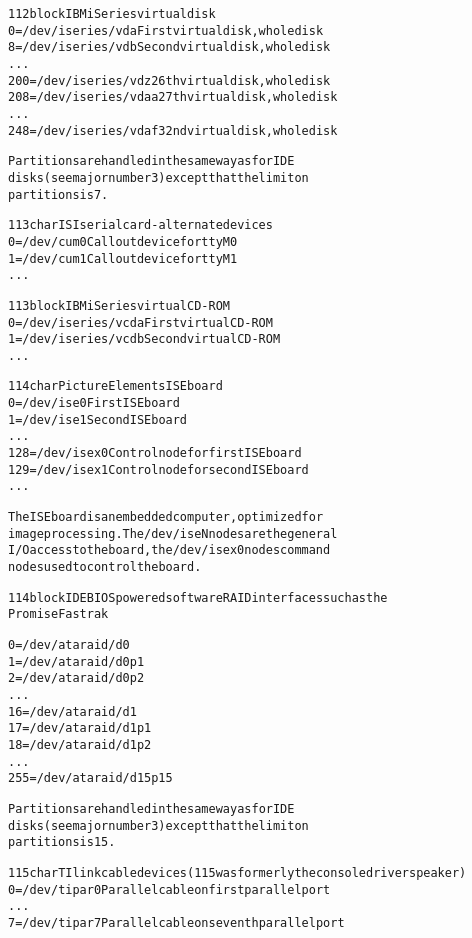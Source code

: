 \documentclass[a4paper,8pt,english]{sphinxmanual}
\begin{document}
\begin{alltt}
 112 block      IBM iSeries virtual disk
                  0 = /dev/iseries/vda  First virtual disk, whole disk
                  8 = /dev/iseries/vdb  Second virtual disk, whole disk
                    ...
                200 = /dev/iseries/vdz  26th virtual disk, whole disk
                208 = /dev/iseries/vdaa 27th virtual disk, whole disk
                    ...
                248 = /dev/iseries/vdaf 32nd virtual disk, whole disk

                Partitions are handled in the same way as for IDE
                disks (see major number 3) except that the limit on
                partitions is 7.

 113 char       ISI serial card - alternate devices
                  0 = /dev/cum0         Callout device for ttyM0
                  1 = /dev/cum1         Callout device for ttyM1
                    ...

 113 block      IBM iSeries virtual CD-ROM
                  0 = /dev/iseries/vcda First virtual CD-ROM
                  1 = /dev/iseries/vcdb Second virtual CD-ROM
                    ...

 114 char       Picture Elements ISE board
                  0 = /dev/ise0         First ISE board
                  1 = /dev/ise1         Second ISE board
                    ...
                128 = /dev/isex0        Control node for first ISE board
                129 = /dev/isex1        Control node for second ISE board
                    ...

                The ISE board is an embedded computer, optimized for
                image processing. The /dev/iseN nodes are the general
                I/O access to the board, the /dev/isex0 nodes command
                nodes used to control the board.

 114 block       IDE BIOS powered software RAID interfaces such as the
                Promise Fastrak

                   0 = /dev/ataraid/d0
                   1 = /dev/ataraid/d0p1
                   2 = /dev/ataraid/d0p2
                  ...
                  16 = /dev/ataraid/d1
                  17 = /dev/ataraid/d1p1
                  18 = /dev/ataraid/d1p2
                  ...
                 255 = /dev/ataraid/d15p15

                Partitions are handled in the same way as for IDE
                disks (see major number 3) except that the limit on
                partitions is 15.

 115 char       TI link cable devices (115 was formerly the console driver speaker)
                  0 = /dev/tipar0    Parallel cable on first parallel port
                  ...
                  7 = /dev/tipar7    Parallel cable on seventh parallel port


\end{alltt}
\end{document}
